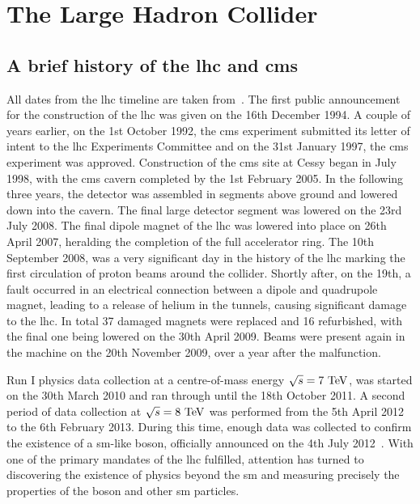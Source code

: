\section{The Large Hadron Collider}
\label{sec:LHC}

\subsection{A brief history of the \acrshort{lhc} and \acrshort{cms}}
\label{ssec:LHCHist}
All dates from the \acrshort{lhc} timeline are taken from~\cite{LHCtimeline}.
The first public announcement for the construction of the \acrshort{lhc} was given on the 16th December 1994. 
A couple of years earlier, on the 1st October 1992, the \acrshort{cms} experiment submitted its letter of intent to the \acrshort{lhc} Experiments Committee and on the 31st January 1997, the \acrshort{cms} experiment was approved.
Construction of the \acrshort{cms} site at Cessy began in July 1998, with the \acrshort{cms} cavern completed by the 1st February 2005.
In the following three years, the detector was assembled in segments above ground and lowered down into the cavern.
The final large detector segment was lowered on the 23rd July 2008.
The final dipole magnet of the \acrshort{lhc} was lowered into place on 26th April 2007, heralding the completion of the full accelerator ring.
The 10th September 2008, was a very significant day in the history of the \acrshort{lhc} marking the first circulation of proton beams around the collider. 
Shortly after, on the 19th, a fault occurred in an electrical connection between a dipole and quadrupole magnet, leading to a release of helium in the tunnels, causing significant damage to the \acrshort{lhc}. 
In total 37 damaged magnets were replaced and 16 refurbished, with the final one being lowered on the 30th April 2009. 
Beams were present again in the machine on the 20th November 2009, over a year after the malfunction. 

Run I physics data collection at a centre-of-mass energy $\sqrt{s}=7\mathrm{~Te\hspace{-.08em}V}^{}$, was started on the 30th March 2010 and ran through until the 18th October 2011. 
A second period of data collection at $\sqrt{s}=8\mathrm{~Te\hspace{-.08em}V}^{}$ was performed from the 5th April 2012 to the 6th February 2013. 
During this time, enough data was collected to confirm the existence of a \acrshort{sm}-like \Hboson{} boson, officially announced on the 4th July 2012~\cite{CMS:Higgs}.
With one of the primary mandates of the \acrshort{lhc} fulfilled, attention has turned to discovering the existence of physics beyond the \acrshort{sm} and measuring precisely the properties of the \Hboson{} boson and other \acrshort{sm} particles.

